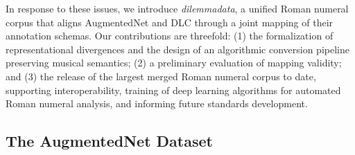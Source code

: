 \documentclass[sigconf]{acmart} %
\begin{document}
In response to these issues, we introduce \textit{dilemmadata}, a unified Roman numeral corpus that aligns AugmentedNet and DLC through a joint mapping of their annotation schemas. Our contributions are threefold: (1) the formalization of representational divergences and the design of an algorithmic conversion pipeline preserving musical semantics; (2) a preliminary evaluation of mapping validity; and (3) the release of the largest merged Roman numeral corpus to date, supporting interoperability, training of deep learning algorithms for automated Roman numeral analysis, and informing future standards development.



\subsection{The AugmentedNet Dataset}
\end{document}
